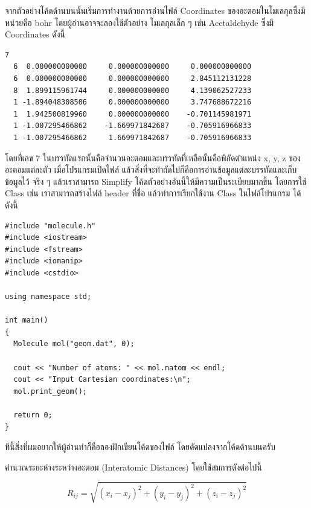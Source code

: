 \vspace{5pt}

จากตัวอย่างโค้ดด้านบนนั้นเริ่มการทำงานด้วยการอ่านไฟล์ Coordinates ของอะตอมในโมเลกุลซึ่งมีหน่วยคือ bohr โดยผู้อ่านอาจจะลองใช้ตัวอย่าง%
โมเลกุลเล็ก ๆ เช่น Acetaldehyde ซึ่งมี Coordinates ดังนี้

\begin{Verbatim}[frame=single]
  7
  6  0.000000000000     0.000000000000     0.000000000000
  6  0.000000000000     0.000000000000     2.845112131228
  8  1.899115961744     0.000000000000     4.139062527233
  1 -1.894048308506     0.000000000000     3.747688672216
  1  1.942500819960     0.000000000000    -0.701145981971
  1 -1.007295466862    -1.669971842687    -0.705916966833
  1 -1.007295466862     1.669971842687    -0.705916966833
\end{Verbatim}

\noindent โดยที่เลข 7 ในบรรทัดแรกนั้นคือจำนวนอะตอมและบรรทัดที่เหลือนั้นคือพิกัดตำแหน่ง x, y, z ของอะตอมแต่ละตัว เมื่อโปรแกรมเปิดไฟล์%
แล้วสิ่งที่จะทำถัดไปก็คือการอ่านข้อมูลแต่ละบรรทัดและเก็บข้อมูลไว้ จริง ๆ แล้วเราสามารถ Simplify โค้ดตัวอย่างอันนี้ให้มีความเป็นระเบียบมากขึ้น%
โดยการใช้ Class เช่น เราสามารถสร้างไฟล์ header ที่ชื่อ  แล้วทำการเรียกใช้งาน Class ในไฟล์โปรแกรม
 ได้ดังนี้

\vspace{5pt}

\begin{lstlisting}[style=MyC++]
#include "molecule.h"
#include <iostream>
#include <fstream>
#include <iomanip>
#include <cstdio>

using namespace std;

int main()
{
  Molecule mol("geom.dat", 0);

  cout << "Number of atoms: " << mol.natom << endl;
  cout << "Input Cartesian coordinates:\n";
  mol.print_geom();

  return 0;
}
\end{lstlisting}

\vspace{5pt}

\noindent ทีนี้สิ่งที่ผมอยากให้ผู้อ่านทำก็คือลองฝึกเขียนโค้ดของไฟล์  โดยดัดแปลงจากโค้ดด้านบนครับ

\noindent {}

คำนวณระยะห่างระหว่างอะตอม (Interatomic Distances) โดยใช้สมการดังต่อไปนี้

\begin{equation}
  R_{ij}
  =
  \sqrt{
    (x_{i} - x_{j})^{2}
    + (y_{i} - y_{j})^{2}
    + (z_{i} - z_{j})^{2}
  }
\end{equation}

